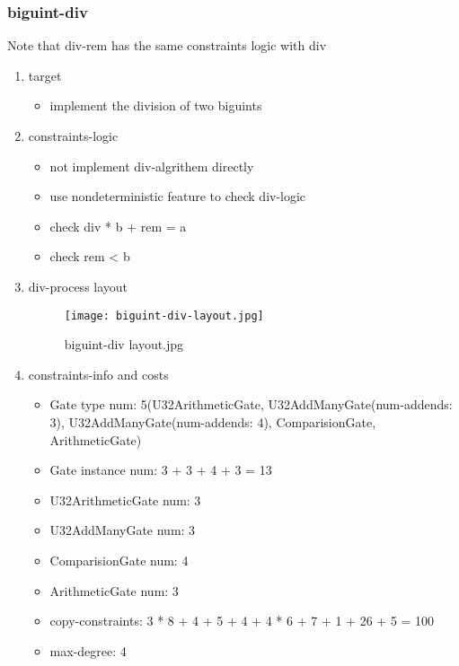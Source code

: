 \subsubsection{biguint-div}
\label{biguint-div}

Note that div-rem has the same constraints logic with div

\begin{enumerate}
    \item target
        \begin{itemize}
            \item implement the division of two biguints
        \end{itemize}
    \item constraints-logic
        \begin{itemize}
            \item not implement div-algrithem directly
            \item use nondeterministic feature to check div-logic
            \item check div * b + rem = a
            \item check rem < b
        \end{itemize}
    \item div-process layout
        \begin{figure}[!ht]
            \centering
            \texttt{[image: biguint-div-layout.jpg]}
            \caption{biguint-div layout.jpg}
            \label{fig:biguint-div-layout.jpg}
        \end{figure}
    
    \item constraints-info and costs
        \begin{itemize}
            \item Gate type num: 5(U32ArithmeticGate, U32AddManyGate(num-addends: 3), U32AddManyGate(num-addends: 4), ComparisionGate, ArithmeticGate)
            \item Gate instance num: 3 + 3 + 4 + 3 = 13 
            \item U32ArithmeticGate num: 3
            \item U32AddManyGate num: 3
            \item ComparisionGate num: 4
            \item ArithmeticGate num: 3
            \item copy-constraints: 3 * 8 + 4 + 5 + 4 + 4 * 6 + 7 + 1 + 26 + 5 = 100 
            \item max-degree: 4
        \end{itemize}

\end{enumerate}